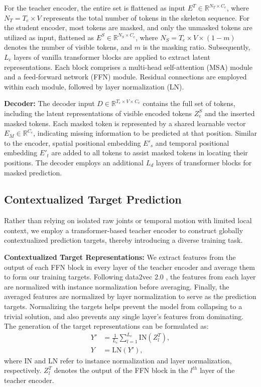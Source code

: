 For the teacher encoder, the entire set is flattened as input $E^{T} \in \mathbb{R}^{N_{T} \times C_{e}}$,
where $N_{T}=T_{e} \times V$ represents the total number of tokens in the
skeleton sequence. For the student encoder, most tokens are masked, and
only the unmasked tokens are utilized as input, flattened as $E^{S} \in \mathbb{R}^{N_{S} \times C_{e}}$,
where $N_{S}=T_{e} \times V \times (1-m)$ denotes the number of visible tokens,
and $m$ is the masking ratio. 
Subsequently, $L_{e}$ layers of vanilla transformer blocks are applied to extract
latent representations. Each block comprises a multi-head self-attention (MSA)
module and a feed-forward network (FFN) module. Residual connections are employed
within each module, followed by layer normalization (LN).

\noindent \textbf{Decoder:} The decoder input
$D \in \mathbb{R}^{T_{e} \times V \times C_{e}}$ contains the full set of tokens,
including the latent representations of visible encoded tokens $Z^{S}_{e}$ and the inserted masked tokens.
Each masked token is represented by a shared learnable vector $E_{M} \in \mathbb{R}^{C_{e}}$,
indicating missing information to be predicted at that position. Similar to the
encoder, spatial positional embedding $E'_{s}$ and temporal positional embedding
$E'_{t}$ are added to all tokens to assist masked tokens in locating their positions.
The decoder employs an additional $L_{d}$ layers of transformer blocks for masked prediction.

\subsection{Contextualized Target Prediction}
Rather than relying on isolated raw joints or temporal motion with limited local context, we employ a
transformer-based teacher encoder to construct globally contextualized prediction targets,
thereby introducing a diverse training task.

\noindent \textbf{Contextualized Target Representations:}
We extract features from the output of each FFN block in every layer of the
teacher encoder and average them to form our training targets. Following data2vec 2.0
\cite{baevski2023efficient}, the features from each layer are normalized with
instance normalization \cite{ulyanov2016instance} before averaging.
Finally, the averaged features are normalized by layer normalization to serve as
the prediction targets. Normalizing the targets helps prevent the model from
collapsing to a trivial solution, and also prevents any single layer's features
from dominating. The generation of the target representations can be formulated as:
\begin{equation}
    \label{eq:target_rep}
    \begin{aligned}
        Y' &= \frac{1}{L_e}\sum_{l=1}^{L_e} \text{IN}(Z_l^T), \\
        Y &= \text{LN}(Y'),
    \end{aligned}
\end{equation}
where IN and LN refer to instance normalization and layer normalization, respectively.
$Z_l^T$ denotes the output of the FFN block in the $l^{th}$ layer of the teacher encoder.

